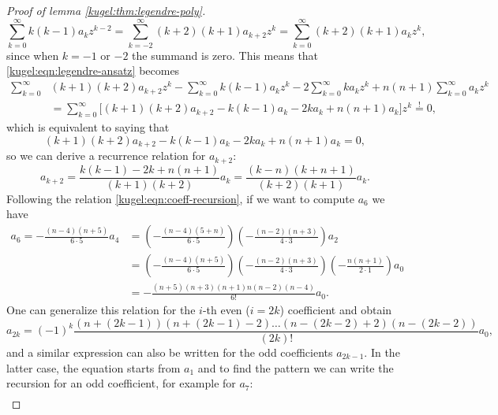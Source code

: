 \begin{proof}[Proof of lemma \ref{kugel:thm:legendre-poly}]
  \begin{equation*}
    \sum_{k=0}^\infty k (k-1) a_k z^{k-2}
    = \sum_{k=-2}^\infty (k+2)(k+1) a_{k+2} z^k
    = \sum_{k=0}^\infty (k+2)(k+1) a_k z^k,
  \end{equation*}
  since when $k = -1$ or $-2$ the summand is zero. This means that
  \eqref{kugel:eqn:legendre-ansatz} becomes
  \begin{align*}
    \sum_{k=0}^\infty &(k+1)(k+2) a_{k+2} z^{k}
      - \sum_{k=0}^\infty k (k-1) a_k z^{k}
      - 2\sum_{k=0}^\infty k a_k z^k
      + n(n+1)\sum_{k=0}^\infty a_k z^k \nonumber \\
    &= \sum_{k=0}^\infty \big[
      (k+1)(k+2) a_{k+2}
      - k (k-1) a_k
      - 2 k a_k
      + n(n+1) a_k
    \big] z^k \stackrel{!}{=} 0,
  \end{align*}
  which is equivalent to saying that
  \begin{equation*}
    (k+1)(k+2) a_{k+2} - k (k-1) a_k - 2 k a_k + n(n+1) a_k = 0,
  \end{equation*}
  so we can derive a recurrence relation for $a_{k+2}$:
  \begin{equation}
    \label{kugel:eqn:coeff-recursion}
    a_{k+2} = \frac{k (k-1) - 2 k + n(n+1)}{(k+1)(k+2)}a_k
    = \frac{(k-n)(k+n+1)}{(k+2)(k+1)}a_k.
  \end{equation}
  Following the relation \eqref{kugel:eqn:coeff-recursion}, if we want to
  compute $a_6$ we have
  \begin{align*}
    a_{6} = -\frac{(n-4)(n+5)}{6\cdot 5} a_4
      &= \left( -\frac{(n-4)(5+n)}{6 \cdot 5} \right)
         \left( -\frac{(n-2)(n+3)}{4 \cdot 3} \right) a_2 \\
      &= \left( -\frac{(n-4)(n+5)}{6 \cdot 5} \right)
         \left( -\frac{(n-2)(n+3)}{4 \cdot 3} \right)
         \left( -\frac{n(n+1)}{2 \cdot 1} \right)  a_0 \\
      &= -\frac{(n+5)(n+3)(n+1)n(n-2)(n-4)}{6!} a_0.
  \end{align*}
  One can generalize this relation for the $i$-th even ($i = 2k$) coefficient
  and obtain
  \begin{equation*}
    a_{2k} = (-1)^k \frac{(n+(2k-1))(n+(2k-1)-2)
      \hdots (n-(2k-2)+2)(n-(2k-2))}{(2k)!}a_0,
  \end{equation*}
  and a similar expression can also be written for the odd coefficients
  $a_{2k-1}$. In the latter case, the equation starts from $a_1$ and to find the
  pattern we can write the recursion for an odd coefficient, for example for
  $a_7$:
  \begin{align*}

\end{align*}
\end{proof}
